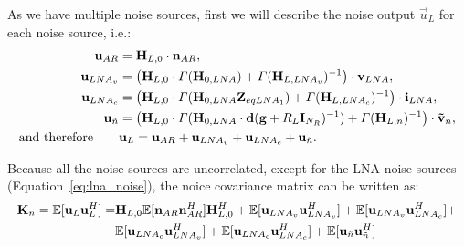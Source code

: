 As we have multiple noise sources, first we will describe the noise output $\vec{u}_L$ for each noise source, i.e.:
\begin{align}
\label{eq:noise_output}
\nonumber
\mathbf{u}_{AR} &= \mathbf{H}_{L,0}\cdot\mathbf{n}_{AR},\\\nonumber 
\mathbf{u}_{LNA_v} &= \left(\mathbf{H}_{L,0}\cdot\Gamma(\mathbf{H}_{0,LNA})+\Gamma(\mathbf{H}_{L,LNA_v})^{-1}\right)\cdot\mathbf{v}_{LNA},\\\nonumber
\mathbf{u}_{LNA_c} &= \left(\mathbf{H}_{L,0}\cdot\Gamma(\mathbf{H}_{0,LNA}\mathbf{Z}_{eqLNA_1})+\Gamma(\mathbf{H}_{L,LNA_c})^{-1}\right)\cdot\mathbf{i}_{LNA},\\\nonumber
\mathbf{u}_{\tilde{n}} &= \left(\mathbf{H}_{L,0}\cdot\Gamma(\mathbf{H}_{0,LNA}\cdot\mathbf{d}(\mathbf{g}+R_L\mathbf{I}_{N_R})^{-1})+\Gamma(\mathbf{H}_{L,n})^{-1}\right)\cdot\mathbf{\tilde{v}}_{n},\\
\text{and therefore}\qquad &\mathbf{u}_L = \mathbf{u}_{AR} + \mathbf{u}_{LNA_v} + \mathbf{u}_{LNA_c} + \mathbf{u}_{\tilde{n}}.
\end{align}

Because all the noise sources are uncorrelated, except for the LNA noise sources (Equation~\eqref{eq:lna_noise}), the noice covariance matrix can be written as:
\begin{align}
\label{eq:exp_noise}\nonumber
\mat{K}_n =\mathbb{E}[\vec{u}_L\vec{u}_L^H] = &\mat{H}_{L,0}\mathbb{E}[\vec{n}_{AR}\vec{n}_{AR}^H]\mat{H}_{L,0}^H + 
\mathbb{E}[\vec{u}_{LNA_v}\vec{u}_{LNA_v}^H] +
\mathbb{E}[\vec{u}_{LNA_v}\vec{u}_{LNA_c}^H] +\\%
\quad&\mathbb{E}[\vec{u}_{LNA_c}\vec{u}_{LNA_v}^H] +
\mathbb{E}[\vec{u}_{LNA_c}\vec{u}_{LNA_c}^H] +
\mathbb{E}[\vec{u}_{\tilde{n}}\vec{u}_{\tilde{n}}^H]
\end{align}

